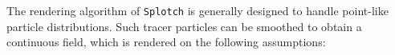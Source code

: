 \documentclass[1p,times]{elsarticle}
\begin{document}
The rendering algorithm of {\tt Splotch} is generally designed to handle
point-like particle distributions. Such tracer particles can be smoothed
to obtain a continuous field, which is rendered
on the following assumptions:
\end{document}
